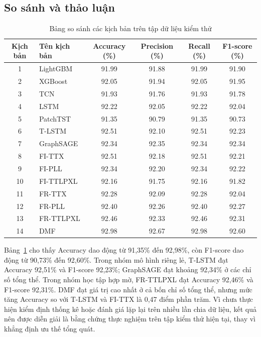 \documentclass[10pt,twoside]{article}
\begin{document}
\subsection{So sánh và thảo luận}

\begin{table}[!htbp]
\centering
\caption{Bảng so sánh các kịch bản trên tập dữ liệu kiểm thử}
\label{tab:test_scenarios_comparison}
\begin{tabular}{c l c c c c}
\hline
\textbf{Kịch bản} & \textbf{Tên kịch bản} & \textbf{Accuracy (\%)} & \textbf{Precision (\%)} & \textbf{Recall (\%)} & \textbf{F1-score (\%)} \\
\hline
1  & LightGBM   & 91.99 & 91.88 & 91.99 & 91.90 \\
2  & XGBoost    & 92.05 & 91.94 & 92.05 & 91.95 \\
3  & TCN        & 91.93 & 91.76 & 91.93 & 91.78 \\
4  & LSTM       & 92.22 & 92.05 & 92.22 & 92.04 \\
5  & PatchTST   & 91.35 & 90.79 & 91.35 & 90.73 \\
6  & T-LSTM     & 92.51 & 92.10 & 92.51 & 92.23 \\
7  & GraphSAGE  & 92.34 & 92.35 & 92.34 & 92.34 \\
8  & FI-TTX     & 92.51 & 92.18 & 92.51 & 92.21 \\
9  & FI-PLL     & 92.34 & 92.20 & 92.34 & 92.22 \\
10 & FI-TTLPXL  & 92.16 & 91.75 & 92.16 & 91.82 \\
11 & FR-TTX     & 92.28 & 92.09 & 92.28 & 92.04 \\
12 & FR-PLL     & 92.40 & 92.26 & 92.40 & 92.27 \\
13 & FR-TTLPXL  & 92.46 & 92.33 & 92.46 & 92.31 \\
14 & DMF        & 92.98 & 92.67 & 92.98 & 92.60 \\
\hline
\end{tabular}
\end{table}
Bảng~\ref{tab:test_scenarios_comparison} cho thấy Accuracy dao động từ 91,35\% đến 92,98\%, còn F1-score dao động từ 90,73\% đến 92,60\%. Trong nhóm mô hình riêng lẻ, T-LSTM đạt Accuracy 92,51\% và F1-score 92,23\%; GraphSAGE đạt khoảng 92,34\% ở các chỉ số tổng thể. Trong nhóm học tập hợp mờ, FR-TTLPXL đạt Accuracy 92,46\% và F1-score 92,31\%. DMF đạt giá trị cao nhất ở cả bốn chỉ số tổng thể, nhưng mức tăng Accuracy so với T-LSTM và FI-TTX là 0,47 điểm phần trăm. Vì chưa thực hiện kiểm định thống kê hoặc đánh giá lặp lại trên nhiều lần chia dữ liệu, kết quả nên được diễn giải là bằng chứng thực nghiệm trên tập kiểm thử hiện tại, thay vì khẳng định ưu thế tổng quát.
\end{document}
